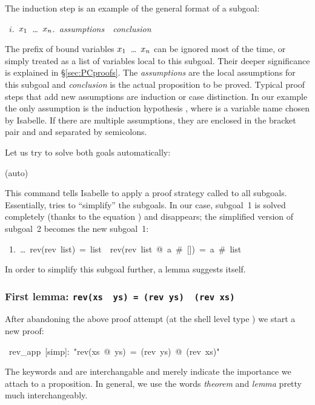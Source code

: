 \begin{isabelle}
\begin{isamarkuptxt}
The induction step is an example of the general format of a subgoal:
\begin{isabellepar}%
~$i$.~{}$x\sb{1}$~\dots~$x\sb{n}$.~{\it assumptions}~{\isasymLongrightarrow}~{\it conclusion}
\end{isabellepar}%
The prefix of bound variables \isasymAnd$x\sb{1}$~\dots~$x\sb{n}$ can be
ignored most of the time, or simply treated as a list of variables local to
this subgoal. Their deeper significance is explained in \S\ref{sec:PCproofs}.
The {\it assumptions} are the local assumptions for this subgoal and {\it
  conclusion} is the actual proposition to be proved. Typical proof steps
that add new assumptions are induction or case distinction. In our example
the only assumption is the induction hypothesis , where  is a variable name chosen by Isabelle. If there
are multiple assumptions, they are enclosed in the bracket pair
 and
 and separated by semicolons.

Let us try to solve both goals automatically:%
\end{isamarkuptxt}%
(auto)%
\begin{isamarkuptxt}%
\noindent
This command tells Isabelle to apply a proof strategy called
 to all subgoals. Essentially,  tries to
``simplify'' the subgoals.  In our case, subgoal~1 is solved completely (thanks
to the equation ) and disappears; the simplified version
of subgoal~2 becomes the new subgoal~1:
\begin{isabellepar}%
~1.~\dots~rev(rev~list)~=~list~{\isasymLongrightarrow}~rev(rev~list~@~a~\#~[])~=~a~\#~list
\end{isabellepar}%
In order to simplify this subgoal further, a lemma suggests itself.%
\end{isamarkuptxt}%
%
\begin{isamarkuptext}%
\subsubsection*{First lemma: \texttt{rev(xs \at~ys) = (rev ys) \at~(rev xs)}}

After abandoning the above proof attempt (at the shell level type
) we start a new proof:%
\end{isamarkuptext}%
\ rev\_app\ [simp]:\ {"}rev(xs\ @\ ys)\ =\ (rev\ ys)\ @\ (rev\ xs){"}%
\begin{isamarkuptxt}%
\noindent The keywords  and
 are interchangable and merely indicate
the importance we attach to a proposition. In general, we use the words
\emph{theorem} and \emph{lemma} pretty much
interchangeably.


\end{isamarkuptxt}
\end{isabelle}
